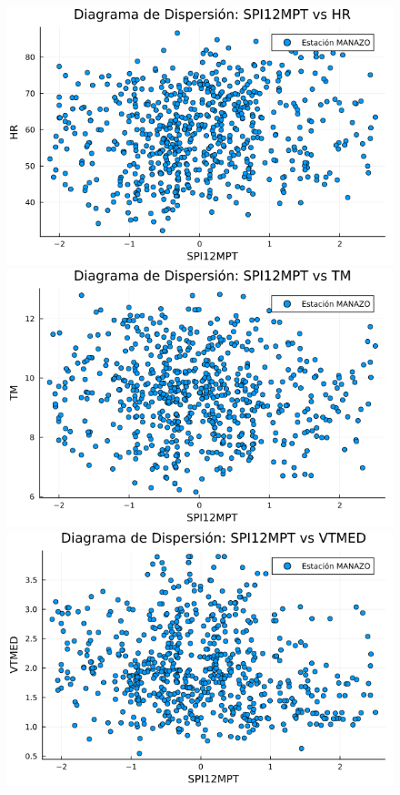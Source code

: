 \begin{figure}[htbp]
\begin{minipage}{0.32\textwidth}
    \centering
    \includegraphics[width=\linewidth]{Capitulos/Scaterplot/MANAZO_SPI12MPT_vs_HR.png}
\end{minipage}\hfill
\begin{minipage}{0.32\textwidth}
    \centering
    \includegraphics[width=\linewidth]{Capitulos/Scaterplot/MANAZO_SPI12MPT_vs_TM.png}
\end{minipage}\hfill
\begin{minipage}{0.32\textwidth}
    \centering
    \includegraphics[width=\linewidth]{Capitulos/Scaterplot/MANAZO_SPI12MPT_vs_VTMED.png}
\end{minipage}


\end{figure}
